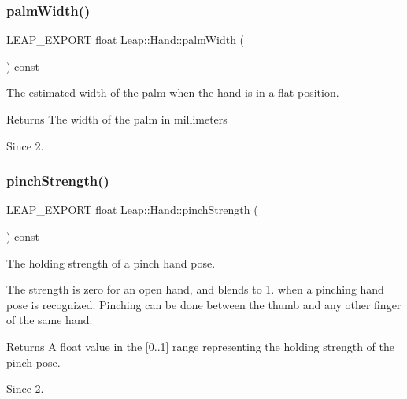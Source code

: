 \subsubsection{\texorpdfstring{palm\+Width()}{palmWidth()}}
{\footnotesize\ttfamily L\+E\+A\+P\+\_\+\+E\+X\+P\+O\+RT float Leap\+::\+Hand\+::palm\+Width (\begin{DoxyParamCaption}{ }\end{DoxyParamCaption}) const}

The estimated width of the palm when the hand is in a flat position.


\begin{DoxyCodeInclude}
\end{DoxyCodeInclude}


\begin{DoxyReturn}{Returns}
The width of the palm in millimeters 
\end{DoxyReturn}
\begin{DoxySince}{Since}
2. 
\end{DoxySince}
\mbox{\label{class_leap_1_1_hand_a736348fe9174978d23b27297da5de072}} 
\subsubsection{\texorpdfstring{pinch\+Strength()}{pinchStrength()}}
{\footnotesize\ttfamily L\+E\+A\+P\+\_\+\+E\+X\+P\+O\+RT float Leap\+::\+Hand\+::pinch\+Strength (\begin{DoxyParamCaption}{ }\end{DoxyParamCaption}) const}

The holding strength of a pinch hand pose.

The strength is zero for an open hand, and blends to 1. when a pinching hand pose is recognized. Pinching can be done between the thumb and any other finger of the same hand.


\begin{DoxyCodeInclude}
\end{DoxyCodeInclude}


\begin{DoxyReturn}{Returns}
A float value in the \mbox{[}0..1\mbox{]} range representing the holding strength of the pinch pose. 
\end{DoxyReturn}
\begin{DoxySince}{Since}
2. 
\end{DoxySince}
\mbox{\label{class_leap_1_1_hand_aa9e572f18122453856267a527abf2bcb}} 
